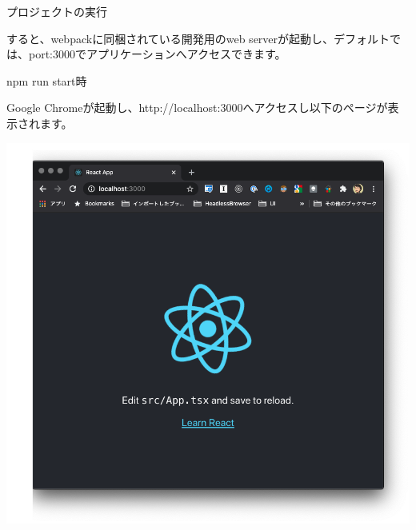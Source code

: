 \def\startercodeblockfontsize{}
\begin{starterterminal}[]{プロジェクトの実行}\end{starterterminal}

すると、webpackに同梱されている開発用のweb serverが起動し、デフォルトでは、port:3000でアプリケーションへアクセスできます。

\def\startercodeblockfontsize{}
\begin{starterterminal}[]{npm run start時}\end{starterterminal}

Google Chromeが起動し、http://localhost:3000へアクセスし以下のページが表示されます。

\begin{reviewimage}[H]%
\includegraphics[width=1.0\maxwidth]{./images/02-create-react-app/02_cra_start.png}%
\label{image:02-create-react-app:02_cra_start}
\end{reviewimage}

